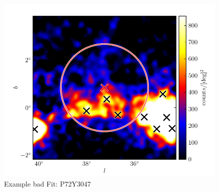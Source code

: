 \documentclass[preprint]{aastex}
\begin{document}
\clearpage
\begin{figure}
  \begin{center}
    \includegraphics{source_plots/example_bad_fit.pdf}
    \caption{Example bad Fit: P72Y3047}
    \label{example_bad_fit}
  \end{center}
\end{figure}
\end{document}
